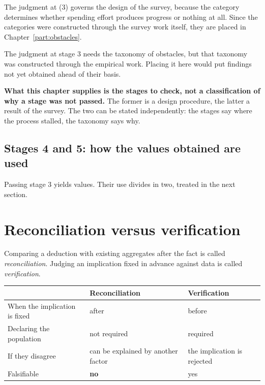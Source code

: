 The judgment at (3) governs the design of the survey, because the category determines
whether spending effort produces progress or nothing at all. Since the categories were
constructed through the survey work itself, they are placed in
Chapter~\ref{part:obstacles}.

\begin{remark}
\label{rem:taxonomy-placement}
The judgment at stage 3 needs the taxonomy of obstacles, but that taxonomy was constructed
through the empirical work. Placing it here would put findings not yet obtained ahead of
their basis.

\textbf{What this chapter supplies is the stages to check, not a classification of why a
stage was not passed.} The former is a design procedure, the latter a result of the survey.
The two can be stated independently: the stages say where the process stalled, the taxonomy
says why.
\end{remark}

\subsection{Stages 4 and 5: how the values obtained are used}

Passing stage 3 yields values. Their use divides in two, treated in the next section.

\section{Reconciliation versus verification}
\label{sec:comparison-vs-test}

Comparing a deduction with existing aggregates after the fact is called \emph{reconciliation}.
Judging an implication fixed in advance against data is called \emph{verification}.

\begin{center}
\begin{tabularx}{\textwidth}{@{}lXX@{}}
\toprule
 & Reconciliation & Verification \\
\midrule
When the implication is fixed & after & before \\
Declaring the population & not required & required \\
If they disagree & can be explained by another factor & the implication is rejected \\
Falsifiable & \textbf{no} & yes \\
\bottomrule
\end{tabularx}
\label{tab:comparison-vs-test}
\end{center}

